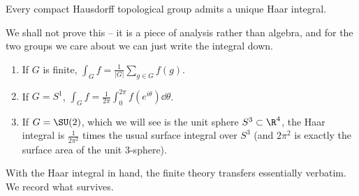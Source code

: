 \begin{theorem}
	Every compact Hausdorff topological group admits a unique Haar integral.
\end{theorem}

We shall not prove this -- it is a piece of analysis rather than algebra, and for the two groups we care about we can just write the integral down.

\begin{example}
	\begin{enumerate}[label=(\roman*)]
		\item If $G$ is finite, $\int_Gf = \frac1{|G|}\sum_{g\in G}f(g)$.
		\item If $G = S^1$, $\displaystyle\int_Gf = \frac1{2\pi}\int_0^{2\pi}f(e^{i\theta})\dd\theta$.
		\item If $G = \SU(2)$, which we will see is the unit sphere $S^3\subset\R^4$, the Haar integral is $\frac{1}{2\pi^2}$ times the usual surface integral over $S^3$ (and $2\pi^2$ is exactly the surface area of the unit $3$-sphere).
	\end{enumerate}
\end{example}

With the Haar integral in hand, the finite theory transfers essentially verbatim. We record what survives.

